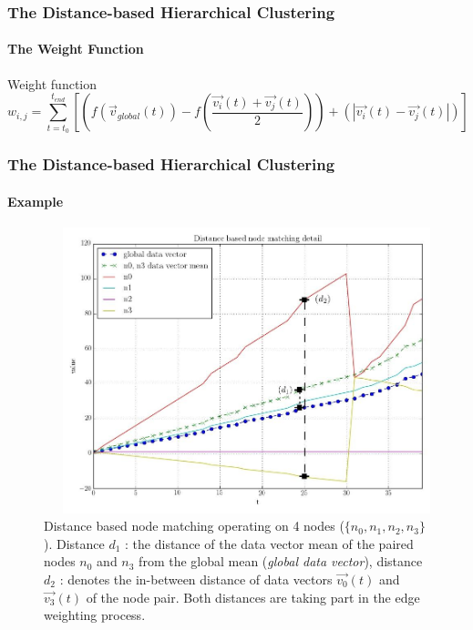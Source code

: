 \documentclass[hyperref={pdfpagelabels=false}]{beamer}
\begin{document}
\begin{frame} \frametitle{The Distance-based Hierarchical Clustering}\framesubtitle{The Weight Function}
\begin{block}{Weight function}
\vspace{0.2cm}
\begin{equation*}
w_{i,j}=
\sum_{t=t_0}^{t_{end}}{[(f(\vec{v}_{global}(t))-f(\frac{\vec{v_i}(t)+\vec{v_j}(t)}{2}))+(|\vec{v_i}(t)-\vec{v_j}(t)|)]}
\end{equation*}
\vspace{0.2cm}
\end{block}
\end{frame}

\begin{frame} \frametitle{The Distance-based Hierarchical Clustering}\framesubtitle{Example}
\begin{figure}
\begin{columns}
\begin{column}[t]{0.4\linewidth}
\vspace{-5.5cm}\caption{Distance based node matching operating on 4 nodes ($\{n_0, n_1, n_2, n_3\}$). Distance $d_1$ : the distance of the data vector mean of the paired nodes $n_0$ and $n_3$ from the global mean (\emph{global data vector}), distance $d_2$ : denotes the in-between distance of data vectors $\vec{v_0}(t)$ and $\vec{v_3}(t)$ of the node pair. Both distances are taking part in the edge weighting process.}
\end{column}
\begin{column}[t]{0.6\linewidth}
\centering
\includegraphics[scale=0.22]{../img/distoptpair_example_detail_edited.jpeg}
\end{column}
\end{columns}
\end{figure}
\end{frame}
\end{document}
